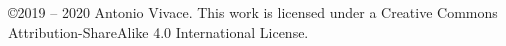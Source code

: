 \documentclass[a4, oneside, 10pt]{memoir}
\begin{document}





\tableofcontents
\thispagestyle{empty}
\addtocounter{page}{-1}



\pagebreak
\listoffigures




\pagebreak
\thispagestyle{empty}
\noindent
\copyright 2019 -- 2020 Antonio Vivace. This work is licensed under a Creative Commons Attribution-ShareAlike 4.0 International License.
\end{document}
